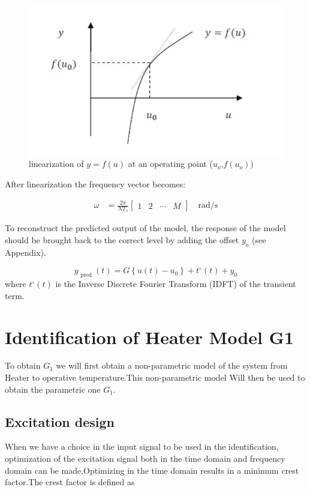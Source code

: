 \documentclass[a4paper,12pt]{report}
\numberwithin{equation}{section}
\begin{document}
\begin{figure}[H]
    \includegraphics[scale=1]{linearization.JPG}
    \centering
    \caption{linearization of $y=f(u)$ at an operating point ($u_{o}$,$f(u_{o})$)}
    \label{eq:linearization}
\end{figure}

After linearization the frequency vector becomes:

\begin{equation}
\begin{aligned}
\omega &=\frac{2 \pi}{N T_{s}}\left[\begin{array}{lllll}
1 & 2 & \cdots & M
\end{array}\right] \quad \mathrm{rad} / \mathrm{s}
\end{aligned}
\end{equation}

To reconstruct the predicted output of the model, the response of the model should be brought back to the correct level by adding the offset $y_{o}$ (see Appendix).

$$
y_{\text { pred }}(t)=G\left\{u(t)-u_{0}\right\}+t^{\circ}(t)+y_{0}
$$
\noindent
where $t^{\circ}(t)$ is the Inverse Discrete Fourier Transform (IDFT) of the transient term.


\section{Identification of Heater Model G1}
To obtain $G_{1}$ we will first obtain a non-parametric model of the system from Heater to operative temperature.This non-parametric model Will then be used to obtain the parametric one $G_{1}$.

\subsection{ Excitation design }
When we have a choice in the input signal to be used in the identification, optimization of the excitation signal both in the time domain and frequency domain can be made.Optimizing in the time domain results in a minimum crest factor.The crest factor is defined as
\end{document}

